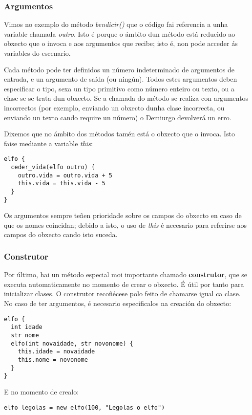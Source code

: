 \subsubsection{Argumentos}
Vimos no exemplo do método {\it bendicir()} que o código fai referencia a unha
variable chamada {\it outro}. Isto é porque o ámbito dun método está reducido ao
obxecto que o invoca e aos argumentos que recibe; isto é, non pode acceder ás
variables do escenario.
\par
Cada método pode ter definidos un número indeterminado de argumentos de entrada,
e un argumento de saída (ou ningún). Todos estes argumentos deben especificar o
tipo, sexa un tipo primitivo como número enteiro ou texto, ou a clase se se
trata dun obxecto. Se a chamada do método se realiza con argumentos incorrectos
(por exemplo, enviando un obxecto dunha clase incorrecta, ou enviando un texto
cando require un número) o Demiurgo devolverá un erro.
\par
Dixemos que no ámbito dos métodos tamén está o obxecto que o invoca. Isto
faise mediante a variable {\it this}:
\begin{lstlisting}
elfo {
  ceder_vida(elfo outro) {
    outro.vida = outro.vida + 5
    this.vida = this.vida - 5
  }
}
\end{lstlisting}
\par
Os argumentos sempre teñen prioridade sobre os campos do obxecto en caso de que
os nomes coincidan; debido a isto, o uso de {\it this} é necesario para
referirse aos campos do obxecto cando isto suceda.

\subsubsection{Construtor}
\label{subsubsec:construtor}
Por último, hai un método especial moi importante chamado {\bf construtor}, que
se executa automaticamente no momento de crear o obxecto. É útil por tanto para
inicializar clases. O construtor recoñécese polo feito de chamarse igual ca
clase. No caso de ter argumentos, é necesario especificalos na creación do
obxecto:
\begin{lstlisting}
elfo {
  int idade
  str nome
  elfo(int novaidade, str novonome) {
    this.idade = novaidade
    this.nome = novonome
  }
}
\end{lstlisting}
\par E no momento de crealo:
\begin{lstlisting}
elfo legolas = new elfo(100, "Legolas o elfo")
\end{lstlisting}

